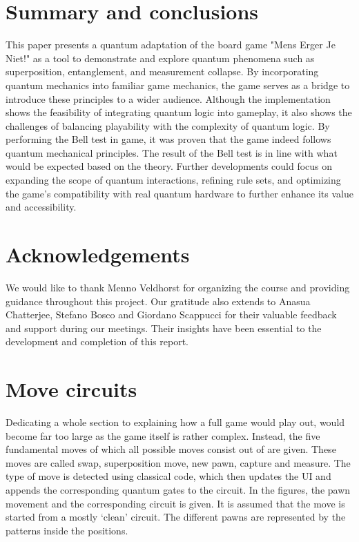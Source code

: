 \documentclass[final,5p,times,twocolumn,authoryear]{elsarticle}
\begin{document}
\section{Summary and conclusions}
This paper presents a quantum adaptation of the board game "Mens Erger Je Niet!" as a tool to demonstrate and explore quantum phenomena such as superposition, entanglement, and measurement collapse. By incorporating quantum mechanics into familiar game mechanics, the game serves as a bridge to introduce these principles to a wider audience. Although the implementation shows the feasibility of integrating quantum logic into gameplay, it also shows the challenges of balancing playability with the complexity of quantum logic. 
By performing the Bell test in game, it was proven that the game indeed follows quantum mechanical principles. The result of the Bell test is in line with what would be expected based on the theory.
Further developments could focus on expanding the scope of quantum interactions, refining rule sets, and optimizing the game's compatibility with real quantum hardware to further enhance its value and accessibility.


\section*{Acknowledgements}
We would like to thank Menno Veldhorst for organizing the course and providing guidance throughout this project. Our gratitude also extends to Anasua Chatterjee, Stefano Bosco and Giordano Scappucci for their valuable feedback and support during our meetings. Their insights have been essential to the development and completion of this report.

\appendix

\section{Move circuits}\label{app:ExampleMoves}
Dedicating a whole section to explaining how a full game would play out, would become far too large as the game itself is rather complex. Instead, the five fundamental moves of which all possible moves consist out of are given. These moves are called swap, superposition move, new pawn, capture and measure. The type of move is detected using classical code, which then updates the UI and appends the corresponding quantum gates to the circuit.
In the figures, the pawn movement and the corresponding circuit is given. It is assumed that the move is started from a mostly ‘clean’ circuit. The different pawns are represented by the patterns inside the positions.
\end{document}
